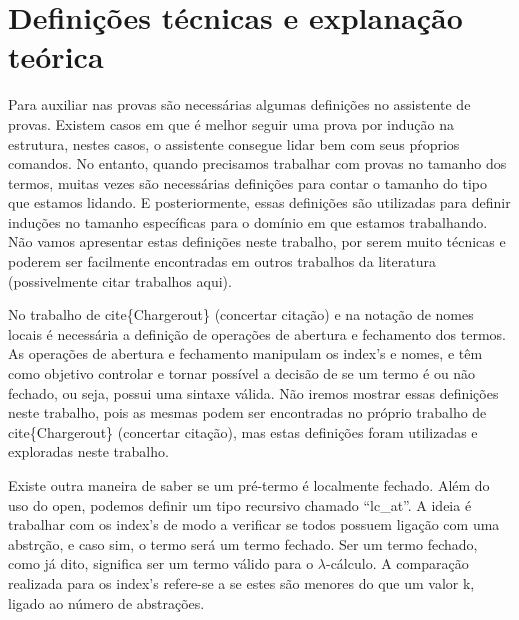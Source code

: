 \section{Definições técnicas e explanação teórica}



 Para auxiliar nas provas são necessárias algumas definições no assistente de provas. Existem casos em que é melhor
seguir uma prova por indução na estrutura, nestes casos, o assistente consegue lidar bem com seus pŕoprios comandos. No entanto,
quando precisamos trabalhar com provas no tamanho dos termos, muitas vezes são necessárias definições para contar o tamanho do
tipo que estamos lidando. E posteriormente, essas definições são utilizadas para definir induções no tamanho específicas para o 
domínio em que estamos trabalhando. Não vamos apresentar estas definições neste trabalho, por serem muito técnicas e poderem
ser facilmente encontradas em outros trabalhos da literatura (possivelmente citar trabalhos aqui). 

 No trabalho de cite\{Chargerout\} (concertar citação) e na notação de nomes locais é necessária a definição de operações de
abertura e fechamento dos termos. As operações de abertura e fechamento manipulam os index's e nomes, e têm como objetivo controlar
e tornar possível a decisão de se um termo é ou não fechado, ou seja, possui uma sintaxe válida. Não iremos mostrar essas definições
neste trabalho, pois as mesmas podem ser encontradas no próprio trabalho de cite\{Chargerout\} (concertar citação), mas estas definições
foram utilizadas e exploradas neste trabalho. \begin{coqdoccode}
\coqdocemptyline
\coqdocemptyline
\end{coqdoccode}
Existe outra maneira de saber se um pré-termo é localmente fechado. Além do uso do open, 
podemos definir um tipo recursivo chamado ``lc\_at''. A ideia é trabalhar com os index's de modo
a verificar se todos possuem ligação com uma abstrção, e caso sim, o termo será um termo fechado.
Ser um termo fechado, como já dito, significa ser um termo válido para o $\lambda$-cálculo. A comparação
realizada para os index's refere-se a se estes são menores do que um valor k, ligado ao número de 
abstrações. 

